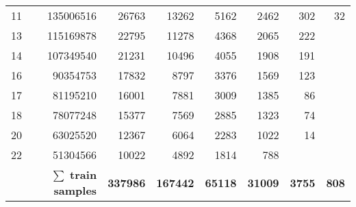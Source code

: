 \begin{table}[hbp]
\begin{tabular}{lrrrrrrr}
11                                                       & 135006516                                               & 26763                  & 13262                   & 5162                    & 2462                    & 302                      & 32                       \\
13                                                       & 115169878                                               & 22795                  & 11278                   & 4368                    & 2065                    & 222                      &                          \\
14                                                       & 107349540                                               & 21231                  & 10496                   & 4055                    & 1908                    & 191                      &                          \\
16                                                       & 90354753                                                & 17832                  & 8797                    & 3376                    & 1569                    & 123                      &                          \\
17                                                       & 81195210                                                & 16001                  & 7881                    & 3009                    & 1385                    & 86                       &                          \\
18                                                       & 78077248                                                & 15377                  & 7569                    & 2885                    & 1323                    & 74                       &                          \\
20                                                       & 63025520                                                & 12367                  & 6064                    & 2283                    & 1022                    & 14                       &                          \\
22                                                       & 51304566                                                & 10022                  & 4892                    & 1814                    & 788                     &                          &                          \\
\multicolumn{2}{r}{$\mathbf{\sum}$ \textbf{train samples}}                          & \textbf{337986} & \textbf{167442}  & \textbf{65118}   & \textbf{31009}   & \textbf{3755}   & \textbf{808}                      \\

\end{tabular}
\end{table}
